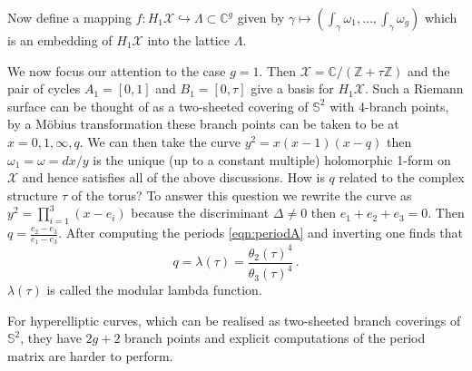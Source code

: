 \documentclass[main.tex]{subfiles}
\begin{document}
Now define a mapping $f:H_1\mathcal{X}\hookrightarrow\Lambda\subset\mathbb{C}^g$ given by $\gamma\mapsto(\int_{\gamma}\omega_1,\dots,\int_{\gamma}\omega_g)$ which is an embedding of $H_1\mathcal{X}$ into the lattice $\Lambda$.

We now focus our attention to the case $g=1$. Then $\mathcal{X}=\mathbb{C}/(\mathbb{Z}+\tau\mathbb{Z})$ and the pair of cycles $A_1=[0,1]$ and $B_1=[0,\tau]$ give a basis for $H_1\mathcal{X}$. Such a Riemann surface can be thought of as a two-sheeted covering of $\mathbb{S}^2$ with 4-branch points, by a M\"obius transformation these branch points can be taken to be at $x=0,1,\infty,q$. We can then take the curve $y^2=x(x-1)(x-q)$ then $\omega_1=\omega=dx/y$ is the unique (up to a constant multiple) holomorphic 1-form on $\mathcal{X}$ and hence satisfies all of the above discussions.
How is $q$ related to the complex structure $\tau$ of the torus? To answer this question we rewrite the curve as $y^2=\prod_{i=1}^3(x-e_i)$ because the discriminant $\Delta\neq0$ then $e_1+e_2+e_3=0$. Then $q=\frac{e_2-e_3}{e_1-e_3}$. After computing the periods \eqref{eqn:periodA} and inverting one finds that
\begin{equation}\label{eqn:lam}
q=\lambda(\tau)=\frac{\theta_2(\tau)^4}{\theta_3(\tau)^4}\,.
\end{equation}
$\lambda(\tau)$ is called the modular lambda function.

For hyperelliptic curves, which can be realised as two-sheeted branch coverings of $\mathbb{S}^2$, they have $2g+2$ branch points and explicit computations of the period matrix are harder to perform.
\end{document}
